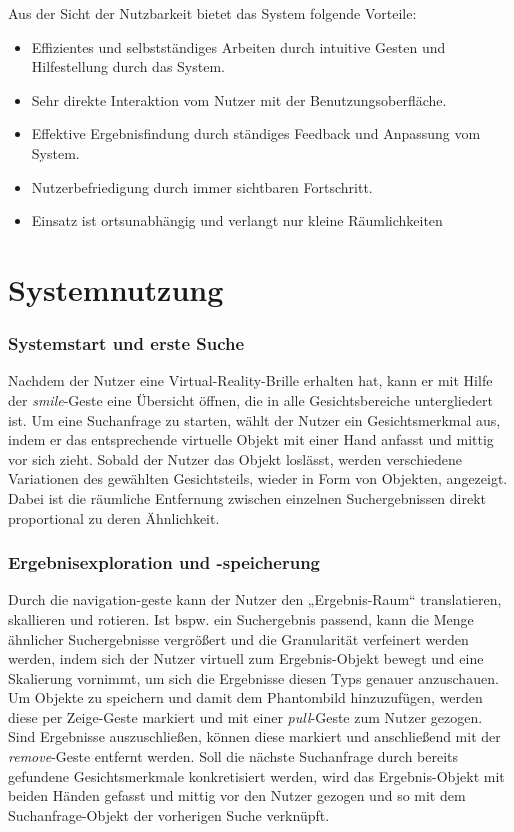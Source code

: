 \documentclass{sigchi-ext}
\begin{document}
Aus der Sicht der Nutzbarkeit bietet das System folgende Vorteile:
\begin{itemize}\compresslist%
\item Effizientes und selbstständiges Arbeiten durch intuitive Gesten und Hilfestellung durch das System.
\item Sehr direkte Interaktion vom Nutzer mit der Benutzungsoberfläche.
\item Effektive Ergebnisfindung durch ständiges Feedback und Anpassung vom System.
\item Nutzerbefriedigung durch immer sichtbaren Fortschritt.
\item Einsatz ist ortsunabhängig und verlangt nur kleine Räumlichkeiten
\end{itemize}

\section{Systemnutzung}
\subsubsection{Systemstart und erste Suche}
Nachdem der Nutzer eine Virtual-Reality-Brille erhalten hat, kann er mit Hilfe der \textit{smile}-Geste eine Übersicht öffnen, die in alle Gesichtsbereiche untergliedert ist. Um eine Suchanfrage zu starten, wählt der Nutzer ein Gesichtsmerkmal aus, indem er das entsprechende virtuelle Objekt mit einer Hand anfasst und mittig vor sich zieht. Sobald der Nutzer das Objekt loslässt, werden verschiedene Variationen des gewählten Gesichtsteils, wieder in Form von Objekten, angezeigt.
Dabei ist die räumliche Entfernung zwischen einzelnen Suchergebnissen direkt proportional zu deren Ähnlichkeit.

\subsubsection{Ergebnisexploration und -speicherung}
Durch die navigation-geste kann der Nutzer den „Ergebnis-Raum“
translatieren, skallieren und rotieren. Ist bspw. ein Suchergebnis
passend, kann die Menge ähnlicher Suchergebnisse vergrößert und die
Granularität verfeinert werden werden, indem sich der Nutzer virtuell zum Ergebnis-Objekt bewegt und eine Skalierung vornimmt, um sich die Ergebnisse diesen Typs genauer anzuschauen.
Um Objekte zu speichern und damit dem Phantombild hinzuzufügen, werden diese per Zeige-Geste markiert und mit einer \textit{pull}-Geste zum Nutzer gezogen. Sind Ergebnisse auszuschließen, können diese markiert und anschließend mit der \textit{remove}-Geste entfernt werden.
Soll die nächste Suchanfrage durch bereits gefundene Gesichtsmerkmale konkretisiert werden, wird das Ergebnis-Objekt mit beiden Händen gefasst und mittig vor den Nutzer gezogen und so mit dem Suchanfrage-Objekt der vorherigen Suche verknüpft.
\end{document}
